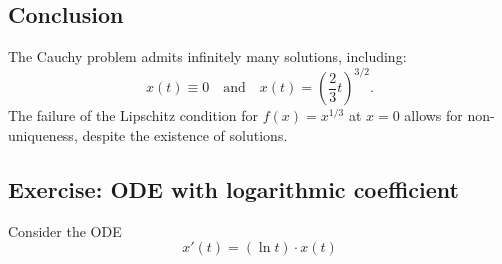 \subsection*{Conclusion}

The Cauchy problem admits infinitely many solutions, including:
\[
x(t) \equiv 0 \quad \text{and} \quad x(t) = \left( \frac{2}{3} t \right)^{3/2}.
\]
The failure of the Lipschitz condition for \( f(x) = x^{1/3} \) at \( x = 0 \) allows for non-uniqueness, despite the existence of solutions.

\subsection{Exercise: ODE with logarithmic coefficient}

Consider the ODE
\[
x'(t) = (\ln t) \cdot x(t)
\]

